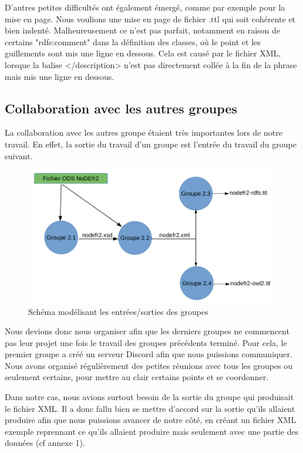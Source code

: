 \documentclass{article}
\begin{document}
D'autres petites difficultés ont également émergé, comme par exemple pour la mise en page. Nous voulions une mise en page de fichier .ttl qui soit cohérente et bien indenté. Malheureusement ce n'est pas parfait, notamment en raison de certains "rdfs:comment" dans la définition des classes, où le point et les guillements sont mis une ligne en dessous. Cela est causé par le fichier XML, lorsque la balise </description> n'est pas directement collée à la fin de la phrase mais mis une ligne en dessous.

\subsection{Collaboration avec les autres groupes}

La collaboration avec les autres groupe étaient très importantes lors de notre travail. En effet, la sortie du travail d'un  groupe est l'entrée du travail du groupe suivant. 

\begin{figure}[!ht]
    \center
    \centerline{\includegraphics[width=12cm,height=6cm]{img/schema_groupes}}
    \caption{Schéma modélisant les entrées/sorties des groupes}
\end{figure}

Nous devions donc nous organiser afin que les derniers groupes ne commencent pas leur projet une fois le travail des groupes précédents terminé. Pour cela, le premier groupe a créé un serveur Discord afin que nous puissions communiquer. Nous avons organisé régulièrement des petites réunions avec tous les groupes ou seulement certains, pour mettre au clair certains points et se coordonner.

Dans notre cas, nous avions surtout besoin de la sortie du groupe qui produisait le fichier XML. Il a donc fallu bien se mettre d'accord sur la sortie qu'ils allaient produire afin que nous puissions avancer de notre côté, en créant un fichier XML exemple reprennant ce qu'ils allaient produire mais seulement avec une partie des données (cf annexe 1).
\end{document}
